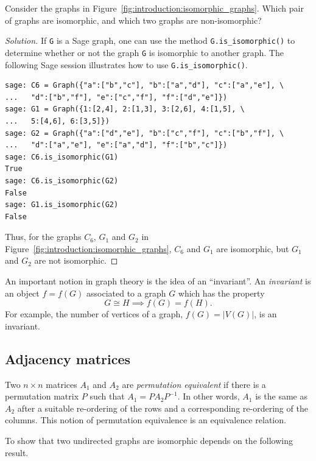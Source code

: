 \begin{example}
Consider the graphs in
Figure~\ref{fig:introduction:isomorphic_graphs}. Which pair of graphs
are isomorphic, and which two graphs are non-isomorphic?
\end{example}

\begin{proof}[Solution]
If \verb!G! is a Sage graph, one can use the method
\verb!G.is_isomorphic()! to determine whether or not the graph
\verb!G! is isomorphic to another graph. The following Sage session
illustrates how to use \verb!G.is_isomorphic()!.
\begin{lstlisting}
sage: C6 = Graph({"a":["b","c"], "b":["a","d"], "c":["a","e"], \
...   "d":["b","f"], "e":["c","f"], "f":["d","e"]})
sage: G1 = Graph({1:[2,4], 2:[1,3], 3:[2,6], 4:[1,5], \
...   5:[4,6], 6:[3,5]})
sage: G2 = Graph({"a":["d","e"], "b":["c","f"], "c":["b","f"], \
...   "d":["a","e"], "e":["a","d"], "f":["b","c"]})
sage: C6.is_isomorphic(G1)
True
sage: C6.is_isomorphic(G2)
False
sage: G1.is_isomorphic(G2)
False
\end{lstlisting}
Thus, for the graphs $C_6$, $G_1$ and $G_2$ in
Figure~\ref{fig:introduction:isomorphic_graphs}, $C_6$ and $G_1$ are
isomorphic, but $G_1$ and $G_2$ are not isomorphic.
\end{proof}

An important notion in graph theory is the idea of an ``invariant''.
An \emph{invariant} is an object $f = f(G)$
associated to a graph $G$ which has the property
\[
G \cong H \implies f(G) = f(H).
\]
For example, the number of vertices of a graph, $f(G) = |V(G)|$, is an
invariant.



\subsection{Adjacency matrices}

Two $n \times n$ matrices $A_1$ and $A_2$ are
\emph{permutation equivalent} if there
is a permutation matrix $P$ such that $A_1 = P A_2 P^{-1}$. In other
words, $A_1$ is the same as $A_2$ after a suitable re-ordering of the
rows and a corresponding re-ordering of the columns. This notion of
permutation equivalence is an equivalence relation.

To show that two undirected graphs are isomorphic depends on the
following result.


